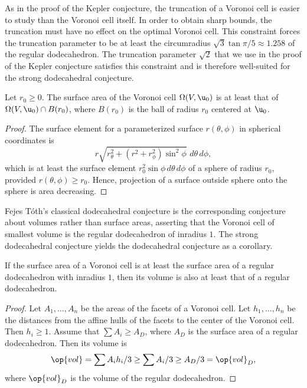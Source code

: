 \begin{remark}
As in the proof of the Kepler conjecture, the truncation of a Voronoi cell is easier
to study than the Voronoi cell itself.  In order to obtain sharp bounds, the truncation
must have no effect on the optimal Voronoi cell.  This constraint forces the
 truncation parameter to be at least
the circumradius $\sqrt{3}\tan{\pi/5}\approx 1.258$ of the regular dodecahedron.   The truncation parameter $\sqrt{2}$
that we use in the proof of the Kepler conjecture satisfies this constraint and is
therefore  well-suited for the strong dodecahedral
conjecture.
\end{remark}

\begin{lemma}[] Let $r_0\ge0$.  %
  The surface area of the Voronoi cell $\Omega(V, \u_0)$ is at least
  that of $\Omega(V, \u_0)\cap B(r_0)$, where $B(r_0)$ is the ball of radius
  $r_0$ centered at $ \u_0$.  
\end{lemma}
%


\begin{proof} The surface element for a parameterized surface
  $r(\theta,\phi)$ in spherical coordinates is
\[
%
  r \sqrt{r_\theta^2 + (r^2 + r_\phi^2)\sin^2\phi } \,\,d\theta\,d\phi,
\]
which is at least the surface element $r_0^2 \sin\phi\, d\theta\,d\phi$
of a sphere of radius $r_0$, provided
$r(\theta,\phi)\ge r_0$.   Hence, projection of a surface outside
sphere onto the sphere is area decreasing.
\end{proof}


Fejes T\'oth's classical dodecahedral conjecture is the corresponding conjecture
about volumes rather than surface areas, asserting that  the
Voronoi cell of smallest volume is the regular dodecahedron of
inradius $1$.  %
The strong dodecahedral conjecture yields the dodecahedral conjecture
as a corollary.

\begin{lemma}[]
  If the surface area of a Voronoi cell is at least the surface area
  of a regular dodecahedron with inradius $1$, then its volume is also
   at least that  of a regular dodecahedron.
\end{lemma}

\begin{proof} Let $A_1,\ldots,A_n$ be the areas of the facets of a
  Voronoi cell.  Let $h_1,\ldots,h_n$ be the distances from the affine
  hulls of the facets to the center of the Voronoi cell.  Then $h_i\ge
  1$.  Assume that $\sum A_i \ge A_D$, where $A_D$ is the surface area
  of a regular dodecahedron.  Then its volume is
\[
\op{vol} = \sum A_i h_i/3 \ge \sum A_i/3 \ge A_D/3 = \op{vol}_D,
\]
where $\op{vol}_D$ is the volume of the regular dodecahedron.
\end{proof}
%
%
%


